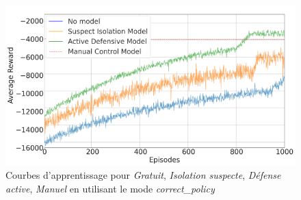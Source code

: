 \begin{figure}[ht]
  \centering
  \includegraphics[width=1\linewidth]{figures/learning_curves.png}
  \caption{Courbes d'apprentissage pour \textit{Gratuit}, \textit{Isolation suspecte}, \textit{Défense active}, \textit{Manuel} en utilisant le mode \textit{correct\_policy} }
  \label{fig:learning_curves}
\end{figure}

